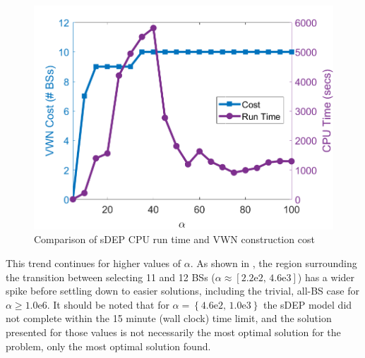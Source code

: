 \documentclass[12pt,dvipsnames]{report}
\newcommand{\expnumber}[2]{{#1}\mathrm{e}{#2}}
\begin{document}
\begin{figure}[ht]
	\centering
	\includegraphics[height=0.45\textheight]{Figures/Prelim_O25sDEPComparisonCostRunTime}
	\caption[Preliminary simulation comparison of sDEP run time and VWN cost]{Comparison of sDEP CPU run time and VWN construction cost}
	\label{fig:Prelim_sDEPCompCostRunTime}
\end{figure}

This trend continues for higher values of $\alpha$.  As shown in , the region surrounding the transition between selecting 11 and 12 BSs ($\alpha \approx \left[ \expnumber{2.2}{2},\, \expnumber{4.6}{3} \right]$) has a wider spike before settling down to easier solutions, including the trivial, all-BS case for $\alpha \geq \expnumber{1.0}{6}$.  It should be noted that for $\alpha = \left\{ \expnumber{4.6}{2},\, \expnumber{1.0}{3} \right\}$ the sDEP model did not complete within the 15 minute (wall clock) time limit, and the solution presented for those values is not necessarily the most optimal solution for the problem, only the most optimal solution found.
\end{document}
